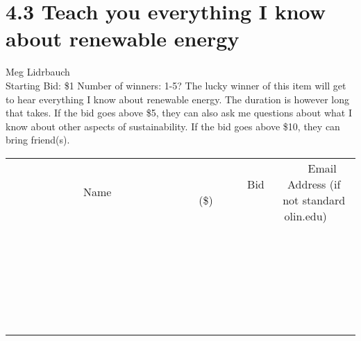 \documentclass[11pt]{article}
\begin{document}
\section*{4.3 Teach you everything I know about renewable energy}
Meg Lidrbauch
\\
Starting Bid: \$1
\newline
Number of winners: 1-5?
\newline
The lucky winner of this item will get to hear everything I know about renewable energy. The duration is however long that takes. If the bid goes above \$5, they can also ask me questions about what I know about other aspects of sustainability. If the bid goes above \$10, they can bring friend(s).
\\[6ex]
\begin{tabular}{c c c}
~~~~~~~~~~~~~Name~~~~~~~~~~~~~ & ~~~~~~~~~Bid (\$)~~~~~~~~~  & ~~~Email Address (if not standard olin.edu)~~~\\
 & & \\
\hline
 & & \\
\hline
 & & \\
\hline
 & & \\
\hline
 & & \\
\hline
 & & \\
\hline
 & & \\
\hline
 & & \\
\hline
 & & \\
\hline
 & & \\
\hline
 & & \\
\hline
 & & \\
\hline
 & & \\
\hline
 & & \\
\hline
 & & \\
\hline
 & & \\
\hline
 & & \\
\hline
 & & \\
\hline
 & & \\
\hline
 & & \\
\hline
 & & \\
\hline
 & & \\
\hline
 & & \\
\hline
 & & \\
\hline
 & & \\
\hline
 & & \\
\hline
\end{tabular}
\newpage
\end{document}

